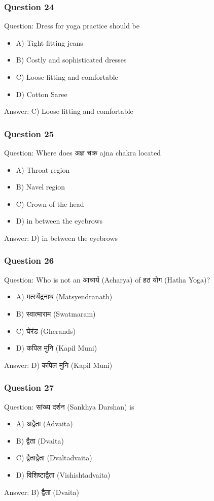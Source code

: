\begin{frame}[fragile]\frametitle{Question 24}
Question: Dress for yoga practice should be
\begin{itemize}
\item A) Tight fitting jeans
\item B) Costly and sophisticated dresses
\item C) Loose fitting and comfortable
\item D) Cotton Saree
\end{itemize}
Answer: C) Loose fitting and comfortable
\end{frame}

\begin{frame}[fragile]\frametitle{Question 25}
Question: Where does अज्ञ चक्र ajna chakra located
\begin{itemize}
\item A) Throat region
\item B) Navel region
\item C) Crown of the head
\item D) in between the eyebrows
\end{itemize}
Answer: D) in between the eyebrows
\end{frame}

\begin{frame}[fragile]\frametitle{Question 26}
Question: Who is not an आचार्य (Acharya) of हठ योग (Hatha Yoga)?
\begin{itemize}
\item A) मत्स्येंद्रनाथ (Matsyendranath)
\item B) स्वात्माराम (Swatmaram)
\item C) घेरंड (Gherands)
\item D) कपिल मुनि (Kapil Muni)
\end{itemize}
Answer: D) कपिल मुनि (Kapil Muni)
\end{frame}

\begin{frame}[fragile]\frametitle{Question 27}
Question: सांख्य दर्शन (Sankhya Darshan) is
\begin{itemize}
\item A) अद्वैता (Advaita)
\item B) द्वैता (Dvaita)
\item C) द्वैताद्वैता (Dvaltadvaita)
\item D) विशिष्टाद्वैता (Vishishtadvaita)
\end{itemize}
Answer: B) द्वैता (Dvaita)
\end{frame}

